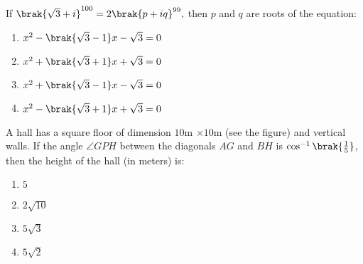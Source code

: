 \item If $ \brak{\sqrt{3} + i}^{100} = 2 \brak{ p + iq}^{99},$ then $p$ and $q$ are roots of the equation:  \hfill {}
\begin{multicols}{2}
\begin{enumerate}
    \item $ x^2 - \brak{\sqrt{3} - 1}x - \sqrt{3} = 0$
    \item $ x^2 + \brak{\sqrt{3} + 1}x + \sqrt{3} = 0$
    \item $ x^2 + \brak{\sqrt{3} - 1}x - \sqrt{3} = 0$
    \item $ x^2 - \brak{\sqrt{3} + 1}x + \sqrt{3} = 0$
\end{enumerate}
\end{multicols}


\item A hall has a square floor of dimension $10$m $\times 10$m (see the figure) and vertical walls. If the angle $\angle GPH$ between the diagonals $AG$ and $BH$ is $\cos^{-1} \brak{ \frac{1}{5}}$, then the height of the hall (in meters) is: \hfill {}

\begin{center}
	
\end{center}    
\begin{multicols}{4}
\begin{enumerate}
    \item $5$
    \item $2\sqrt{10}$
    \item $5\sqrt{3}$
    \item $5\sqrt{2}$
\end{enumerate}
\end{multicols}


%




